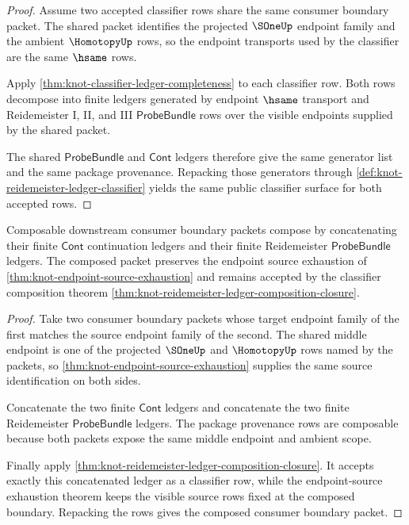 \begin{proof}
Assume two accepted classifier rows share the same consumer boundary packet.
The shared packet identifies the projected $\SOneUp$ endpoint family and the
ambient $\HomotopyUp$ rows, so the endpoint transports used by the classifier
are the same $\hsame$ rows.

Apply \autoref{thm:knot-classifier-ledger-completeness} to each classifier
row. Both rows decompose into finite ledgers generated by endpoint $\hsame$
transport and Reidemeister I, II, and III $\mathsf{ProbeBundle}$ rows over the
visible endpoints supplied by the shared packet.

The shared $\mathsf{ProbeBundle}$ and $\mathsf{Cont}$ ledgers therefore give
the same generator list and the same package provenance. Repacking those
generators through \autoref{def:knot-reidemeister-ledger-classifier} yields
the same public classifier surface for both accepted rows.
\end{proof}

\begin{theorem}\label{thm:knot-consumer-cont-composition}
Composable downstream consumer boundary packets compose by concatenating their
finite $\mathsf{Cont}$ continuation ledgers and their finite Reidemeister
$\mathsf{ProbeBundle}$ ledgers. The composed packet preserves the endpoint
source exhaustion of \autoref{thm:knot-endpoint-source-exhaustion} and remains
accepted by the classifier composition theorem
\autoref{thm:knot-reidemeister-ledger-composition-closure}.
\end{theorem}

\begin{proof}
Take two consumer boundary packets whose target endpoint family of the first
matches the source endpoint family of the second. The shared middle endpoint
is one of the projected $\SOneUp$ and $\HomotopyUp$ rows named by the packets,
so \autoref{thm:knot-endpoint-source-exhaustion} supplies the same source
identification on both sides.

Concatenate the two finite $\mathsf{Cont}$ ledgers and concatenate the two
finite Reidemeister $\mathsf{ProbeBundle}$ ledgers. The package provenance
rows are composable because both packets expose the same middle endpoint and
ambient scope.

Finally apply
\autoref{thm:knot-reidemeister-ledger-composition-closure}. It accepts exactly
this concatenated ledger as a classifier row, while the endpoint-source
exhaustion theorem keeps the visible source rows fixed at the composed
boundary. Repacking the rows gives the composed consumer boundary packet.
\end{proof}


